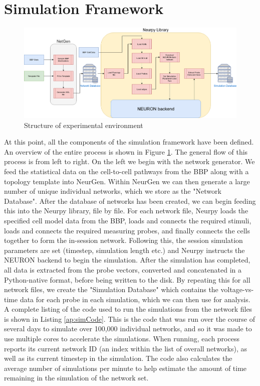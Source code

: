 \section{Simulation Framework}
\begin{figure}[ht]
    \centering
    \includegraphics[width=\textwidth]{04-Methodology/SimFW.png}
    \caption{Structure of experimental environment}
    \label{fig:nrpySimFw}
\end{figure}
At this point, all the components of the simulation framework have been defined. An overview of the entire process is shown in Figure \ref{fig:nrpySimFw}. The general flow of this process is from left to right. On the left we begin with the network generator. We feed the statistical data on the cell-to-cell pathways from the BBP along with a topology template into NeurGen. Within NeurGen we can then generate a large number of unique individual networks, which we store as the "Network Database". After the database of networks has been created, we can begin feeding this into the Neurpy library, file by file. For each network file, Neurpy loads the specified cell model data from the BBP, loads and connects the required stimuli, loads and connects the required measuring probes, and finally connects the cells together to form the in-session network. Following this, the session simulation parameters are set (timestep, simulation length etc.) and Neurpy instructs the NEURON backend to begin the simulation. After the simulation has completed, all data is extracted from the probe vectors, converted and concatenated in a Python-native format, before being written to the disk. By repeating this for all network files, we create the "Simulation Database" which contains the voltage-vs-time data for each probe in each simulation, which we can then use for analysis.\\
A complete listing of the code used to run the simulations from the network files is shown in Listing \ref{ap:simCode}. This is the code that was run over the course of several days to simulate over 100,000 individual networks, and so it was made to use multiple cores to accelerate the simulations. When running, each process reports its current network ID (an index within the list of overall networks), as well as its current timestep in the simulation. The code also calculates the average number of simulations per minute to help estimate the amount of time remaining in the simulation of the network set.

